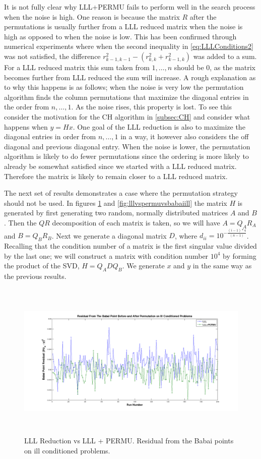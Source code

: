 \documentclass[12pt,Bold,letterpaper]{mcgilletdclass}
\begin{document}
It is not fully clear why LLL+PERMU fails to perform well in the search process when the noise is high. One reason is because the matrix $R$ after the permutations is usually further from a LLL reduced matrix when the noise is high as opposed to when the noise is low. This has been confirmed through numerical experiments where when the second inequality in \ref{eq:LLLConditions2} was not satisfied, the difference $r_{k-1,k-1}^2 - (r_{k,k}^2 + r_{k-1,k}^2)$ was added to a sum. For a LLL reduced matrix this sum taken from $1 , \dots, n$ should be $0$, as the matrix becomes further from LLL reduced the sum will increase. A rough explanation as to why this happens is as follows; when the noise is very low the permutation algorithm finds the column permutations that maximize the diagonal entries in the order from $n , \dots, 1$. As the noise rises, this property is lost. To see this consider the motivation for the CH algorithm in \ref{subsec:CH} and consider what happens when $y = Hx$. One goal of the LLL reduction is also to maximize the diagonal entries in order from $n , \dots, 1$ in a way, it however also considers the off diagonal and previous diagonal entry. When the noise is lower, the permutation algorithm is likely to do fewer permutations since the ordering is more likely to already be somewhat satisfied since we started with a LLL reduced matrix. Therefore the matrix is likely to remain closer to a LLL reduced matrix.

The next set of results demonstrates a case where the permutation strategy should not be used. In figures \ref{fig:lllvspermubabaiill} and \ref{fig:lllvspermuvsbabaiill} the matrix $H$ is generated by first generating two random, normally distributed matrices $A$ and $B$. Then the $QR$ decomposition of each matrix is taken, so we will have $A = Q_AR_A$ and $B = Q_BR_B$. Next we generate a diagonal matrix $D$, where $d_{ii} = 10^{-\frac{(i-1)*4}{(n-1)}}$. Recalling that the condition number of a matrix is the first singular value divided by the last one; we will construct a  matrix with condition number $10^4$ by forming the product of the SVD, $H = Q_ADQ_B$. We generate $x$ and $y$ in the same way as the previous results.

\begin{figure}
\centering
\includegraphics[width=6in,height=3in]{lllvspermubabaiill.png}
\caption{LLL Reduction vs LLL + PERMU. Residual from the Babai points on ill conditioned problems.}
\label{fig:lllvspermubabaiill}
\end{figure}
\end{document}
